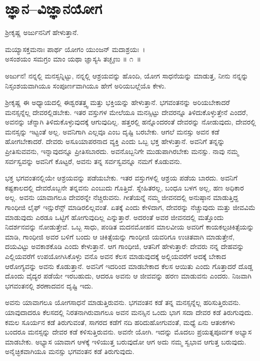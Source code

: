 
\chapter{ಜ್ಞಾನ–ವಿಜ್ಞಾನಯೋಗ}

ಶ‍್ರೀಕೃಷ್ಣ ಅರ್ಜುನನಿಗೆ ಹೇಳುತ್ತಾನೆ.

\begin{shloka}
ಮಯ್ಯಾಸಕ್ತಮನಾಃ ಪಾರ್ಥ ಯೋಗಂ ಯುಂಜನ್ ಮದಾಶ್ರಯಃ~।\\ಅಸಂಶಯಂ ಸಮಗ್ರಂ ಮಾಂ ಯಥಾ ಜ್ಞಾಸ್ಯಸಿ ತಚ್ಛೃಣು \hfill॥ ೧~॥
\end{shloka}

\begin{artha}
ಅರ್ಜುನ! ನನ್ನಲ್ಲಿ ಮನಸ್ಸನ್ನಿಟ್ಟು, ನನ್ನಲ್ಲಿ ಆಶ್ರಯವನ್ನು ಹೊಂದಿ, ಯೋಗ ಸಾಧನೆಯನ್ನು ಮಾಡುತ್ತ, ನೀನು ನನ್ನನ್ನು ನಿಸ್ಸಂಶಯವಾಗಿಯೂ ಸಂಪೂರ್ಣವಾಗಿಯೂ ಹೇಗೆ ಅರಿಯಬಲ್ಲೆಯೊ ಕೇಳು.
\end{artha}

ಶ‍್ರೀಕೃಷ್ಣ ಈ ಅಧ್ಯಾಯದಲ್ಲಿ ಈಶ್ವರತತ್ತ್ವ ಮತ್ತು ಭಕ್ತಿಯನ್ನು ಹೇಳುತ್ತಾನೆ. ಭಗವಂತನನ್ನು ಅರಿಯಬೇಕಾದರೆ ಮನಸ್ಸನ್ನೆಲ್ಲ ದೇವರಲ್ಲಿಡಬೇಕು. ಇತರ ವಸ್ತುಗಳ ಮೇಲೆಯೂ ಮನಸ್ಸಿಟ್ಟು ದೇವರನ್ನೂ ತಿಳಿದುಕೊಳ್ಳುತ್ತೇನೆ ಎಂದರೆ, ಅವನನ್ನು ಚೆನ್ನಾಗಿ ತಿಳಿದುಕೊಳ್ಳುವುದಕ್ಕೆ ಆಗುವುದಿಲ್ಲ. ಹತ್ತರಲ್ಲಿ ಹನ್ನೊಂದರಂತೆ ದೇವರನ್ನು ನೋಡುವುದು, ದೇವರಲ್ಲಿ ಮನಸ್ಸನ್ನು ಇಟ್ಟಂತೆ ಅಲ್ಲ. ಅವನಿಗಾಗಿ ಎಲ್ಲವೂ ಎಂಬ ದೃಷ್ಟಿ ಬರಬೇಕು. ಆಗಲೆ ಮನಸ್ಸು ಅವನ ಕಡೆ ಹೋಗಬೇಕಾದರೆ. ದೇವರು ಅಸೂಯಾಪರನಾದ ವ್ಯಕ್ತಿ ಎಂದು ಒಬ್ಬ ಭಕ್ತ ಹೇಳುತ್ತಾನೆ. ಅವನಿಗೆ ತನ್ನನ್ನು ಪ್ರೀತಿಸುವವನು, ಇನ್ನಾವುದನ್ನೂ ಪ್ರೀತಿಸಬಾರದು. ಅವನೊಬ್ಬನಿಗೇ ಮುಡುಪಾಗಿರಬೇಕು ಮನಸ್ಸು. ನಾವು ನಮ್ಮ ಸರ್ವಸ್ವವನ್ನು ಅವನಿಗೆ ಕೊಟ್ಟರೆ, ಅವನು ತನ್ನ ಸರ್ವಸ್ವವನ್ನೂ ನಮಗೆ ಕೊಡುವನು.

ಭಕ್ತ ಭಗವಂತನಲ್ಲಿಯೇ ಆಶ್ರಯವನ್ನು ಪಡೆಯಬೇಕು. ಇತರ ವಸ್ತುಗಳಲ್ಲಿ ಆಶ್ರಯ ಪಡೆಯ ಬಾರದು. ಅವನಿಗೆ ಕಷ್ಟಕಾಲದಲ್ಲಿ ದೇವರೊಬ್ಬನೇ ತನ್ನವನು ಎಂಬುದು ಗೊತ್ತಿದೆ. ಸ್ನೇಹಿತರಲ್ಲ, ಬಂಧೂ ಬಳಗ ಅಲ್ಲ, ಹಣ ಅಧಿಕಾರ ಅಲ್ಲ. ಅವನು ಯಾವಾಗಲೂ ದೇವರನ್ನೇ ನೆಚ್ಚಿರುವನು. ಗೀತೆಯನ್ನೆ ನಮ್ಮ ಜೀವನದಲ್ಲಿ ಅನುಷ್ಠಾನ ಮಾಡುತ್ತಿದ್ದ ಗಾಂಧೀಜಿ ಲೈಫ್ ಇನ್ಷುರೆನ್ಸ್ ಮಾಡಿರಲಿಲ್ಲವಂತೆ. ಏತಕ್ಕೆ ಎಂದು ಕೇಳಿದಾಗ, ದೇವರನ್ನು ನೆಚ್ಚುವುದು ಮತ್ತು ಜೀವವಿಮೆ ಮಾಡುವುದು ಎರಡೂ ಒಟ್ಟಿಗೆ ಹೋಗುವುದಿಲ್ಲ ಎನ್ನುತ್ತಾರೆ. ಅದರಂತೆ ಅವರ ಜೀವನದಲ್ಲಿ ಮತ್ತೊಂದು ನಿದರ್ಶನವನ್ನು ನೋಡುತ್ತೇವೆ. ಒಬ್ಬ ಸಾಧು, ಪಂಡಿತ ಮದನಮೋಹನ ಮಾಲವೀಯ ಅವರಿಗೆ ಕಾಯಕಲ್ಪಚಿಕಿತ್ಸೆಯನ್ನು ಮಾಡಿ, ಗಾಂಧೀಜಿ ಅವರ ಬಳಿಗೆ ಬಂದು ಆ ಚಿಕಿತ್ಸೆಯನ್ನು ಗಾಂಧೀಜಿ ಯವರಿಗೂ ಉಚಿತವಾಗಿ ಮಾಡುತ್ತೇನೆ, ದಯವಿಟ್ಟು ಅವಕಾಶಕೊಡಿ ಎಂದು ಕೇಳುತ್ತಾನೆ. ಆಗ ಗಾಂಧೀಜಿ, ಆತನಿಗೆ ಹೇಳುತ್ತಾರೆ: ದೇವರು ನನ್ನ ದೇಹವನ್ನು ಎಲ್ಲಿಯವರೆಗೆ ಉಪಯೋಗಿಸಿಕೊಳ್ಳು ವನೊ ಅವನ ಕೆಲಸ ಮಾಡುವುದಕ್ಕೆ ಅಲ್ಲಿಯವರೆಗೆ ಅದಕ್ಕೆ ಬೇಕಾದ ಆರೋಗ್ಯವನ್ನು ಅವನು ಕೊಡುತ್ತಾನೆ. ಅವನಿಗೆ ಇದರಿಂದ ಮಾಡಬೇಕಾದ ಕೆಲಸ ಆಯಿತು ಎಂದು ಗೊತ್ತಾದರೆ ದೊಡ್ಡ ದೊಂದು ವೈದ್ಯರ ಪಡೆಯೇ ಇರಬಹುದು, ಆದರೂ ಅವನು ಆ ಜೀವವನ್ನು ಹರಣ ಮಾಡುವನು ಎಂದರು. ನಿಜವಾಗಿ ಭಗವಂತನಲ್ಲಿ ಶರಣಾದವನ ದೃಷ್ಟಿ ಇದು.

ಅವನು ಯಾವಾಗಲೂ ಯೋಗಸಾಧನೆ ಮಾಡುತ್ತಿರುವನು. ಭಗವಂತನ ಕಡೆ ತನ್ನ ಮನಸ್ಸ\-ನ್ನೆಲ್ಲ ಹರಿಸುತ್ತಿರುವನು. ಯಾವುದಾದರೂ ಕೆಲಸದಲ್ಲಿ ನಿರತನಾಗಿರುವಾಗಲೂ ಅವನ ಮನಸ್ಸಿನ ಒಂದು ಭಾಗ ಸದಾ ದೇವರ ಕಡೆ ತಿರುಗುವುದು. ಕಮಲ ಸೂರ್ಯನ ಕಡೆ ತಿರುಗುವಂತೆ, ಸಾಗರದ ಕಡೆಗೆ ನದಿ ಹರಿದುಹೋಗುವಂತೆ, ಮಧ್ಯೆ ಏನು ಆತಂಕಗಳು ಬಂದರೂ ಮನಸ್ಸನ್ನು ದೇವರ ಕಡೆ ಕಳಿಸುತ್ತಿರುವನು. ಅವನೇ ಯೋಗಿ. ಇದನ್ನು ಮೊದಲು ಪ್ರಯತ್ನಪೂರ್ವಕ ಅಭ್ಯಾಸ ಮಾಡಬೇಕು. ಅಭ್ಯಾಸ ಯಾವಾಗ ಆಳಕ್ಕೆ ಇಳಿಯುತ್ತ ಬರುವುದೋ ಆಗ ಅದು ನಮ್ಮ ಸ್ವಭಾವ ಆಗುತ್ತ ಬರುವುದು. ಅನೈಚ್ಛಿಕವಾಗಿಯೂ ಮನಸ್ಸು ಭಗವಂತನ ಕಡೆ ತಿರುಗುವುದು.

